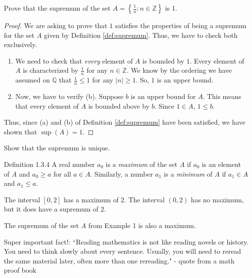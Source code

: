 \documentclass{ximera}
\begin{document}
\begin{example}
    Prove that the supremum of the set $A = \left\{\frac{1}{n} : n \in \mathbb{Z}\right\}$ is 1.
\end{example}
\begin{proof}
    We are asking to prove that $1$ satisfies the properties of being a supremum for the set $A$ given by Definition \ref{def:supremum}.  Thus, we have to check both exclusively.
    \begin{enumerate}
    \item We need to check that \textit{every} element of $A$ is bounded by $1$.  Every element of $A$ is characterized by $\frac{1}{n}$ for any $n \in \mathbb{Z}$.  We know by the ordering we have assumed on $\mathbb{Q}$ that $\frac{1}{n} \leq 1$ for any $|n| \geq 1$.  So, $1$ is an upper bound.  
    \item Now, we have to verify (b).  Suppose $b$ is an upper bound for $A$.  This means that every element of $A$ is bounded above by $b$.  Since $1 \in A$, $1 \leq b$.
    \end{enumerate}
    Thus, since (a) and (b) of Definition \ref{def:supremum} have been satisfied, we have shown that $\sup(A) = 1$.
\end{proof}

\begin{exercise}
    Show that the supremum is unique.
\end{exercise}

\begin{definition}{Definition 1.3.4}\label{def:maximum}
    A real number $a_0$ is a \textit{maximum} of the set $A$ if $a_0$ is an element of $A$ and $a_0 \geq a$ for all $a \in A$.  Similarly, a number $a_1$ is a \textit{minimum} of $A$ if $a_1 \in A$ and $a_1 \leq a$.
\end{definition}

\begin{example}
    The interval $[0,2]$ has a maximum of $2$.  The interval $(0,2)$ has no maximum, but it does have a supremum of $2$.
\end{example}
\begin{example}
    The supremum of the set $A$ from Example 1 is also a maximum.
\end{example}

Super important fact!: ``Reading mathematics is not like reading novels or history. You need to think slowly about every sentence. Usually, you will need to reread the same material later, often more than one rereading." - quote from a math proof book
\end{document}
